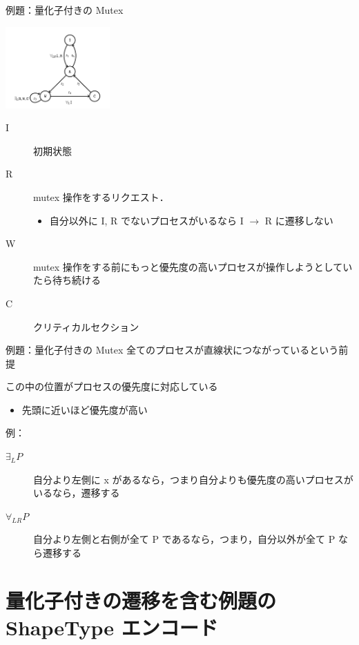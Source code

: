\documentclass[presentation, xetex]{beamer}
\begin{document}
\begin{frame}[label={sec:org1205e20}]{例題：量化子付きの Mutex}
\begin{center}
\includegraphics[width=0.3\textwidth]{./images/priority-mutex.png}
\end{center}


\begin{description}
\item[{I}] 初期状態
\item[{R}] mutex 操作をするリクエスト．
\begin{itemize}
\item 自分以外に I, R でないプロセスがいるなら I \(\longrightarrow\) R に遷移しない
\end{itemize}
\item[{W}] mutex 操作をする前にもっと優先度の高いプロセスが操作しようとしていたら待ち続ける
\item[{C}] クリティカルセクション
\end{description}
\end{frame}



\begin{frame}[label={sec:orgb19e4e8}]{例題：量化子付きの Mutex}
全てのプロセスが直線状につながっているという前提

この中の位置がプロセスの優先度に対応している
\begin{itemize}
\item 先頭に近いほど優先度が高い
\end{itemize}


例：
\begin{description}
\item[{\(\exists_{L} P\)}] 自分より左側に x があるなら，つまり自分よりも優先度の高いプロセスがいるなら，遷移する

\item[{\(\forall_{LR} P\)}] 自分より左側と右側が全て P であるなら，つまり，自分以外が全て P なら遷移する
\end{description}
\end{frame}


\section{量化子付きの遷移を含む例題の ShapeType エンコード}
\label{sec:orgce1eabb}
\end{document}
